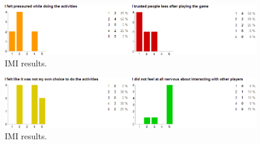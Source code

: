 \begin{figure}[htbp]
\centering
\includegraphics[width=1.0\textwidth]{Pictures/imi_3}
\caption{IMI results.}
\label{fig:8}
\end{figure}

\begin{figure}[htbp]
\centering
\includegraphics[width=1.0\textwidth]{Pictures/imi_4}
\caption{IMI results.}
\label{fig:9}
\end{figure}
